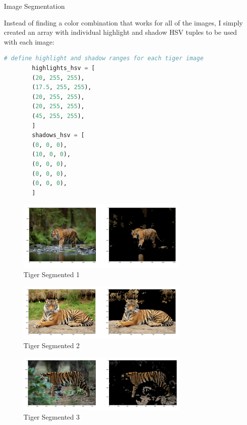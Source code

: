 \begin{hwkProblem}{3.4}{Image Segmentation}
		
	Instead of finding a color combination that works for all of the images, I simply created an array with individual highlight and shadow HSV tuples to be used with each image:

	\begin{lstlisting}[language=python]
		# define highlight and shadow ranges for each tiger image
		highlights_hsv = [
		(20, 255, 255),
		(17.5, 255, 255),
		(20, 255, 255),
		(20, 255, 255),
		(45, 255, 255),
		]
		shadows_hsv = [
		(0, 0, 0),
		(10, 0, 0),
		(0, 0, 0),
		(0, 0, 0),
		(0, 0, 0),
		]
	\end{lstlisting}

	\begin{figure}[ht!]
	  \centering
	  \includegraphics[width=0.75\textwidth]{./tigers/3.4.1.png}
	  \caption{Tiger Segmented 1}
	\end{figure}

	\begin{figure}[ht!]
	  \centering
	  \includegraphics[width=0.75\textwidth]{./tigers/3.4.2.png}
	  \caption{Tiger Segmented 2}
	\end{figure}

	\begin{figure}[ht!]
	  \centering
	  \includegraphics[width=0.75\textwidth]{./tigers/3.4.3.png}
	  \caption{Tiger Segmented 3}
	\end{figure}


\end{hwkProblem}
